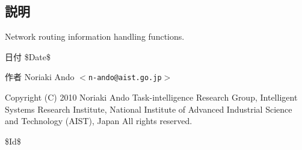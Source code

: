 \subsection{説明}
Network routing information handling functions. \begin{DoxyDate}{日付}
\$Date\$ 
\end{DoxyDate}
\begin{DoxyAuthor}{作者}
Noriaki Ando $<${\tt n-\/ando@aist.go.jp}$>$
\end{DoxyAuthor}
Copyright (C) 2010 Noriaki Ando Task-\/intelligence Research Group, Intelligent Systems Research Institute, National Institute of Advanced Industrial Science and Technology (AIST), Japan All rights reserved.

\$Id\$ 
